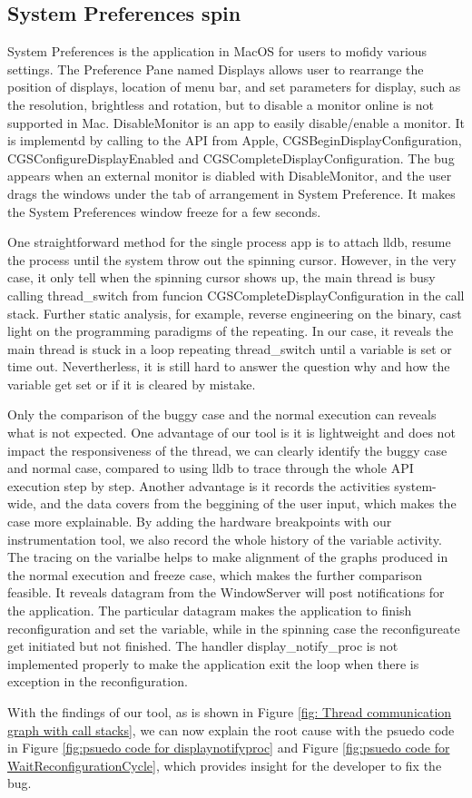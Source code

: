 \subsection{System Preferences spin}
System Preferences is the application in MacOS for users to mofidy various settings.
The Preference Pane named Displays allows user to rearrange the position of displays, location of menu bar, and set parameters for display, such as the resolution, brightless and rotation,
but to disable a monitor online is not supported in Mac.
DisableMonitor is an app to easily disable/enable a monitor.
It is implementd by calling to the API from Apple, CGSBeginDisplayConfiguration, CGSConfigureDisplayEnabled and CGSCompleteDisplayConfiguration.
The bug appears when an external monitor is diabled with DisableMonitor, and the user drags the windows under the tab of arrangement in System Preference.
It makes the System Preferences window freeze for a few seconds.\par
One straightforward method for the single process app is to attach lldb, resume the process until the system throw out the spinning cursor.
However, in the very case, it only tell when the spinning cursor shows up, the main thread is busy calling thread\_switch from funcion CGSCompleteDisplayConfiguration in the call stack.
Further static analysis, for example, reverse engineering on the binary, cast light on the programming paradigms of the repeating.
In our case, it reveals the main thread is stuck in a loop repeating thread\_switch until a variable is set or time out.
Nevertherless, it is still hard to answer the question why and how the variable get set or if it is cleared by mistake.
\par
Only the comparison of the buggy case and the normal execution can reveals what is not expected.
One advantage of our tool is it is lightweight and does not impact the responsiveness of the thread,
we can clearly identify the buggy case and normal case,
compared to using lldb to trace through the whole API execution step by step.
Another advantage is it records the activities system-wide,
and the data covers from the beggining of the user input, which makes the case more explainable.
By adding the hardware breakpoints with our instrumentation tool,
we also record the whole history of the variable activity.
The tracing on the varialbe helps to make alignment of the graphs produced in the normal execution and freeze case, which makes the further comparison feasible.
It reveals datagram from the WindowServer will post notifications for the application.
The particular datagram makes the application to finish reconfiguration and set the variable, while in the spinning case the reconfigureate get initiated but not finished.
The handler display\_notify\_proc is not implemented properly to make the application exit the loop when there is exception in the reconfiguration.\par
With the findings of our tool, as is shown in Figure \ref{fig: Thread communication graph with call stacks},
we can now explain the root cause with the psuedo code in Figure \ref{fig:psuedo code for displaynotifyproc} and Figure \ref{fig:psuedo code for WaitReconfigurationCycle},
which provides insight for the developer to fix the bug.
